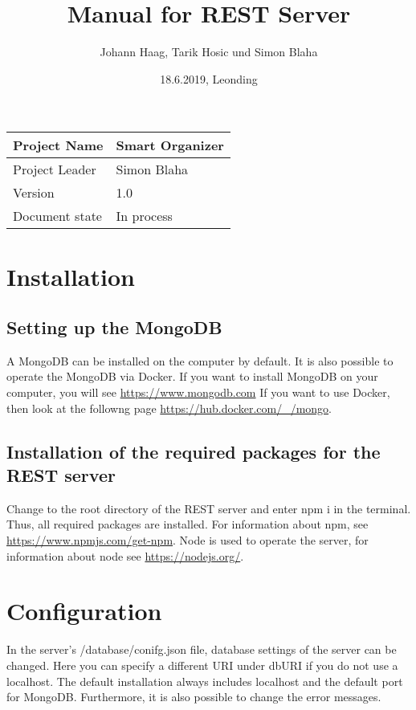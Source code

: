 \documentclass[12pt]{scrartcl}
\title{Manual for REST Server}
\author{Johann Haag, Tarik Hosic und Simon Blaha}
\date{18.6.2019, Leonding}
\begin{document}
    \maketitle
    \begin{flushleft}
    \begin{tabular}{|l|l|}
    \hline
    Project Name & Smart Organizer \\ \hline
    Project Leader & Simon Blaha \\ \hline
    Version & 1.0\\ \hline
    Document state & In process \\ \hline
    \end{tabular}
    \end{flushleft}

    \pagebreak
    \tableofcontents
    \pagebreak

    \section{Installation}
    \subsection{Setting up the MongoDB}
        A MongoDB can be installed on the computer by default. It is also possible to operate the MongoDB via Docker.
        If you want to install MongoDB on your computer, you will see \url{https://www.mongodb.com} 
        If you want to use Docker, then look at the followng page \url{https://hub.docker.com/_/mongo}.
    \subsection{Installation of the required packages for the REST server}
        Change to the root directory of the REST server and enter npm i in the terminal.
        Thus, all required packages are installed.
        For information about npm, see \url{https://www.npmjs.com/get-npm}.
        Node is used to operate the server, for information about node see \url{https://nodejs.org/}.

    \section{Configuration}      
        In the server's /database/conifg.json file, database settings of the server can be changed.
        Here you can specify a different URI under dbURI if you do not use a localhost.
        The default installation always includes localhost and the default port for MongoDB.
        Furthermore, it is also possible to change the error messages.
\end{document}
